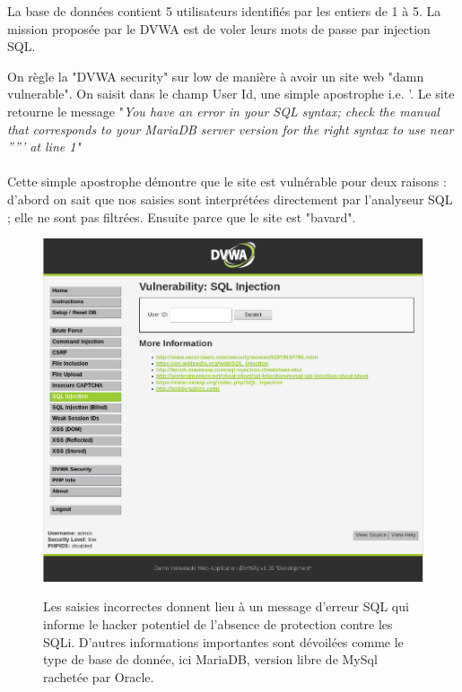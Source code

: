 La base de données contient 5 utilisateurs identifiés par les entiers de 1 à 5.
La mission proposée par le DVWA est de voler leurs mots de passe par injection SQL.

On règle la "DVWA security" sur low de manière à avoir un site web "damn vulnerable".
On saisit dans le champ User Id, une simple apostrophe i.e. '. Le site retourne le message
"\it {You have an error in your SQL syntax; check the manual that corresponds to your MariaDB server version for the right syntax to use near ''''' at line 1}"

\paragraph{}Cette simple apostrophe démontre que le site est vulnérable pour deux raisons : d'abord on sait que nos saisies sont interprétées directement par l'analyseur SQL ; elle ne sont pas filtrées. Ensuite parce que le site est "bavard".

\begin{figure}[!h]
	\begin{center}
		\label{}
		\includegraphics[scale=\scaledvwa]{images/sql/sqli1.png}
		\caption{Les saisies incorrectes donnent lieu à un message d'erreur SQL qui informe le hacker potentiel de l'absence de protection contre les SQLi. D'autres informations importantes sont dévoilées comme le type de base de donnée, ici MariaDB, version libre de MySql rachetée par Oracle.}
	\end{center}
\end{figure}

